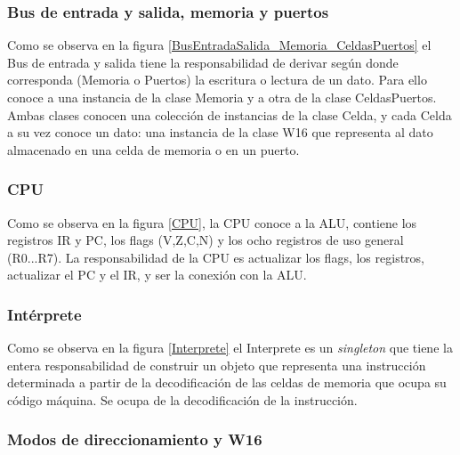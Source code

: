 
\subsubsection{Bus de entrada y salida, memoria y puertos}
Como se observa en la figura \ref{BusEntradaSalida_Memoria_CeldasPuertos} el Bus de entrada y salida tiene la responsabilidad de derivar según donde corresponda (Memoria o Puertos) la escritura o lectura de un dato. Para ello conoce a una instancia de la clase Memoria y a otra de la clase CeldasPuertos. 
Ambas clases conocen una colección de instancias de la clase Celda, y cada Celda a su vez conoce un dato: una instancia de la clase W16 que representa al dato almacenado en una celda de memoria o en un puerto.  


\subsubsection{CPU}
Como se observa en la figura \ref{CPU}, la CPU conoce a la ALU, contiene los registros IR y PC, los flags (V,Z,C,N) y los ocho registros de uso general (R0...R7). La responsabilidad de la CPU es actualizar los flags, los registros, actualizar el PC y el IR, y ser la conexión con la ALU.


\subsubsection{Intérprete} \label{claseinterprete}
Como se observa en la figura \ref{Interprete} el Interprete es un \textit{singleton} que tiene la entera responsabilidad de construir un objeto que representa una instrucción determinada a partir de la decodificación de las celdas de memoria que ocupa su código máquina. Se ocupa de la decodificación de la instrucción.


\subsubsection{Modos de direccionamiento y W16}

